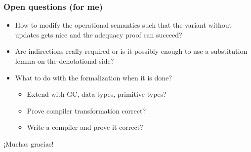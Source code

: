 \documentclass{beamer}
\begin{document}
\begin{frame}
\frametitle{Open questions (for me)}

\begin{itemize}
\item How to modify the operational semantics such that the variant without updates gets nice and the adequacy proof can succeed?
\item Are indirections really required or is it possibly enough to use a substitution lemma on the denotational side?
\item What to do with the formalization when it is done?
\begin{itemize}
\item Extend with GC, data types, primitive types?
\item Prove compiler transformation correct?
\item Write a compiler and prove it correct?
\end{itemize}
\end{itemize}
\end{frame}

\begin{frame}
\begin{center}
¡Muchas gracias!
\end{center}
\end{frame}
\end{document}
